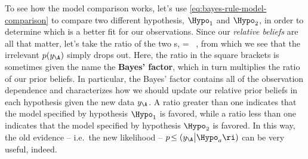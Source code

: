 To see how the model comparison works, let's use \eqref{eq:bayes-rule-model-comparison} to compare two different hypothesis, $\Hypo_1$ and $\Hypo_2$, in order to determine which is a better fit for our observations. 
Since our \emph{relative beliefs} are all that matter, let's take the ratio of the two  s,
\be\label{eq:bayes-factor}
 =  \, ,
\ee
from which we see that the irrelevant  $p( y_{\A})$ simply drops out.
Here, the ratio in the square brackets is sometimes given the name the \textbf{Bayes' factor}, which in turn multiplies the ratio of our prior beliefs.
In particular, the Bayes' factor contains all of the observation dependence and characterizes how we should update our relative prior beliefs in each hypothesis given the new data $y_{\A}$.
A ratio 
greater than one indicates that the model specified by hypothesis $\Hypo_1$ is favored, while a ratio less than one indicates that the model specified by hypothesis $\Hypo_2$ is favored. In this way, the old evidence -- i.e.~the new likelihood -- $p\!\le(y_{\A}\big\vert \Hypo_{a}\ri)$ can be very useful, indeed.










